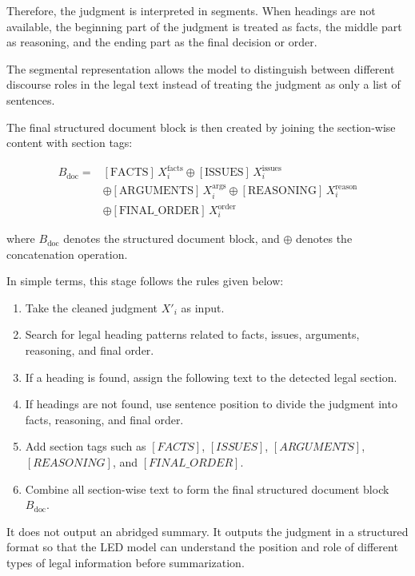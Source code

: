 Therefore, the judgment is interpreted in segments. When headings are not available, the beginning part of the judgment is treated as facts, the middle part as reasoning, and the ending part as the final decision or order.

The segmental representation allows the model to distinguish between different discourse roles in the legal text instead of treating the judgment as only a list of sentences.

The final structured document block is then created by joining the section-wise content with section tags:

\begin{equation}
\begin{aligned}
B_{\text{doc}} ={}& [\text{FACTS}]\,X_i^{\text{facts}}
\oplus [\text{ISSUES}]\,X_i^{\text{issues}} \\
&\oplus [\text{ARGUMENTS}]\,X_i^{\text{args}}
\oplus [\text{REASONING}]\,X_i^{\text{reason}} \\
&\oplus [\text{FINAL\_ORDER}]\,X_i^{\text{order}}
\end{aligned}
\end{equation}

where \(B_{\text{doc}}\) denotes the structured document block, and \(\oplus\) denotes the concatenation operation.

In simple terms, this stage follows the rules given below:

\begin{enumerate}
\item Take the cleaned judgment \(X'_i\) as input.
\item Search for legal heading patterns related to facts, issues, arguments, reasoning, and final order.
\item If a heading is found, assign the following text to the detected legal section.
\item If headings are not found, use sentence position to divide the judgment into facts, reasoning, and final order.
\item Add section tags such as \([FACTS]\), \([ISSUES]\), \([ARGUMENTS]\), \([REASONING]\), and \([FINAL\_ORDER]\).
\item Combine all section-wise text to form the final structured document block \(B_{\text{doc}}\).
\end{enumerate}

It does not output an abridged summary. It outputs the judgment in a structured format so that the LED model can understand the position and role of different types of legal information before summarization.

